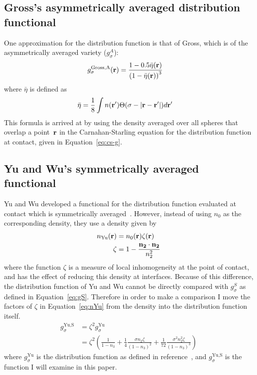 \subsection{Gross's asymmetrically averaged distribution functional}\label{sec:gross}
One approximation for the distribution function is that of
Gross\cite{gross2009density}, which is of the asymmetrically averaged
variety ($g_\sigma^A$):
\begin{align}
  g_\sigma^\text{Gross,A}(\textbf{r}) &= \frac{1 - 0.5\bar{\eta}(\mathbf{r})}{\left(1 -
    \bar{\eta}(\mathbf{r})\right)^3}
\end{align}
where $\bar{\eta}$ is defined as
\begin{align}
\bar{\eta} &= \frac{1}{8} \int n(\textbf{r}') \Theta(\sigma -\left|\textbf{r} - \textbf{r}'\right|)
  d\textbf{r}'
\end{align}
This formula is arrived at by using the density averaged over all
spheres that overlap a point~$\textbf{r}$ in the
Carnahan-Starling equation for the distribution function at contact,
given in Equation~\ref{eq:cs-g}.

\subsection{Yu and Wu's symmetrically averaged functional}\label{sec:yuwu}

Yu and Wu developed a functional for the distribution function
evaluated at contact which is symmetrically
averaged~\cite{yu2002fmt-dft-inhomogeneous-associating}.  However,
instead of using $n_0$ as the corresponding density, they use a
density given by
\begin{align}
  n_\text{Yu}(\textbf{r}) &= n_0(\textbf{r}) \zeta(\textbf{r}) \label{eq:nYu} \\
  \zeta &= 1 - \frac{\mathbf{n_2}\cdot\mathbf{n_2}}{n_2^2} \label{eq:zeta}
\end{align}
where the function $\zeta$ is a measure of local inhomogeneity at the
point of contact, and has the effect of reducing this density at
interfaces.  Because of this difference, the distribution function of
Yu and Wu cannot be directly compared with $g_\sigma^S$ as defined in
Equation~\ref{eq:gS}.  Therefore in order to make a comparison I move
the factors of $\zeta$ in Equation~\ref{eq:nYu} from the density into
the distribution function itself.
\begin{align}
  g_\sigma^\text{Yu,S} &= \zeta^2 g_\sigma^\text{Yu} \\
   &= \zeta^2\left(\frac{1}{1-n_3}
    + \frac14 \frac{\sigma n_2\zeta}{(1-n_3)^2}
    + \frac1{72} \frac{\sigma^2 n_2^2 \zeta}{(1-n_3)^3}\right)
\end{align}
where $g_\sigma^\text{Yu}$ is the distribution function as defined in
reference~\cite{yu2002fmt-dft-inhomogeneous-associating}, and
$g_\sigma^\text{Yu,S}$ is the function I will examine in this paper.


